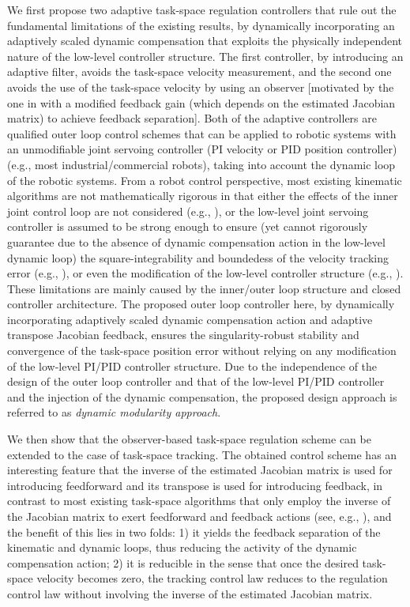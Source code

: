 \documentclass[9pt,technote]{IEEEtran}
\begin{document}
We first propose two adaptive task-space regulation controllers that rule out the fundamental limitations of the existing results, by dynamically incorporating an adaptively scaled dynamic compensation that exploits the physically independent nature of the low-level controller structure. The first controller, by introducing an adaptive filter, avoids the task-space velocity measurement, and the second one avoids the use of the task-space velocity by using an observer [motivated by the one in \cite{Wang2015_CCC} with a modified feedback gain (which depends on the estimated Jacobian matrix) to achieve feedback separation].
 Both of the adaptive controllers are qualified outer loop control schemes that can be applied to robotic systems with an unmodifiable joint servoing controller (PI velocity or PID position controller) (e.g., most industrial/commercial robots), taking into account the dynamic loop of the robotic systems. From a robot control perspective, most existing kinematic algorithms are not mathematically rigorous in that either the effects of the inner joint control loop are not considered (e.g., \cite{Weiss1987_JRA,Siciliano1990_Robotica,Hutchinson1996_TRA}), or the low-level joint servoing controller is assumed to be strong enough to ensure (yet cannot rigorously guarantee due to the absence of dynamic compensation action in the low-level dynamic loop) the square-integrability and boundedess of the velocity tracking error (e.g., \cite{Wang2016_TAC,Wang2015_TACsubmitted}), or even the modification of the low-level controller structure (e.g., \cite{Aicardi1995_ICRA,Roy2002_TRA,Kelly2005_AUT}). These limitations are mainly caused by the inner/outer loop structure and closed controller architecture. The proposed outer loop controller here, by dynamically
 incorporating adaptively scaled dynamic compensation action and adaptive transpose Jacobian feedback, ensures the singularity-robust stability and convergence of the task-space position error without relying on any modification of the low-level PI/PID controller structure. Due to the independence of the design of the outer loop controller and that of the low-level PI/PID controller and the injection of the dynamic compensation, the proposed design approach is referred to as \emph{dynamic modularity approach}.

 We then show that the observer-based task-space regulation scheme can be extended to the case of task-space tracking. The obtained control scheme has an interesting feature that the inverse of the estimated Jacobian matrix is used for introducing feedforward and its transpose is used for introducing feedback, in contrast to most existing task-space algorithms that only employ the inverse of the Jacobian matrix to exert feedforward and feedback actions (see, e.g., \cite{Slotine1987_IJRR,Niemeyer1991_IJRR,Cheah2006_IJRR,Wang2015_AUT}), and the benefit of this lies in two folds: 1) it yields the feedback separation of the kinematic and dynamic loops, thus reducing the activity of the dynamic compensation action; 2) it is reducible in the sense that once the desired task-space velocity becomes zero, the tracking control law reduces to the regulation control law without involving the inverse of the estimated Jacobian matrix.
\end{document}
